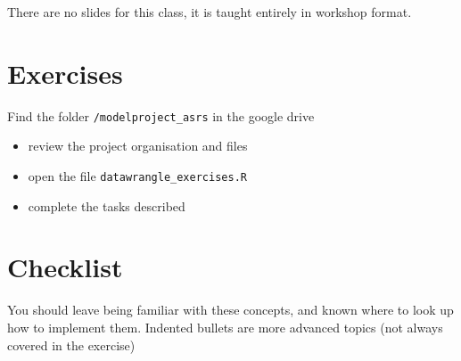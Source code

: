 \documentclass[
  12pt,
  a5paper,
]{book}
\providecommand{\tightlist}{%
  \setlength{\itemsep}{0pt}\setlength{\parskip}{0pt}}
\begin{document}
There are no slides for this class, it is taught entirely in workshop format.

\hypertarget{exercises-2}{%
\section{Exercises}\label{exercises-2}}

Find the folder \texttt{/modelproject\_asrs} in the google drive

\begin{itemize}
\tightlist
\item
  review the project organisation and files
\item
  open the file \texttt{datawrangle\_exercises.R}
\item
  complete the tasks described
\end{itemize}

\hypertarget{checklist-3}{%
\section{Checklist}\label{checklist-3}}

You should leave being familiar with these concepts, and known where to look up how to implement them. Indented bullets are more advanced topics (not always covered in the exercise)
\end{document}
